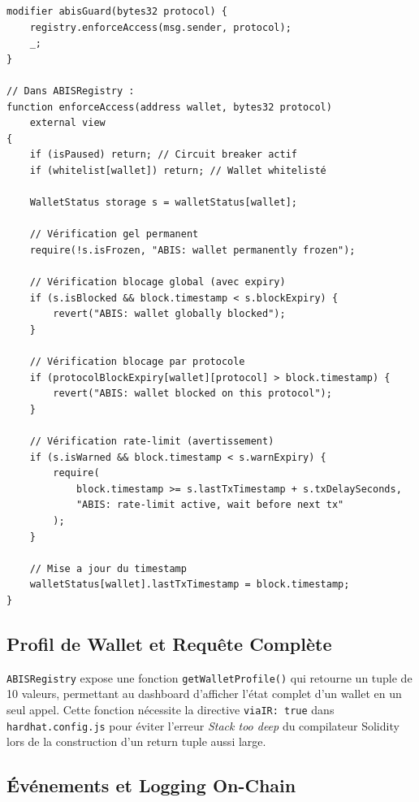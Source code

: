\documentclass[12pt,a4paper]{report}
\newcommand{\code}[1]{\texttt{#1}}
\begin{document}
\begin{lstlisting}[language=Solidity, caption={Modificateur abisGuard et enforceAccess}, label={lst:abis_guard}]
modifier abisGuard(bytes32 protocol) {
    registry.enforceAccess(msg.sender, protocol);
    _;
}

// Dans ABISRegistry :
function enforceAccess(address wallet, bytes32 protocol)
    external view
{
    if (isPaused) return; // Circuit breaker actif
    if (whitelist[wallet]) return; // Wallet whitelisté

    WalletStatus storage s = walletStatus[wallet];

    // Vérification gel permanent
    require(!s.isFrozen, "ABIS: wallet permanently frozen");

    // Vérification blocage global (avec expiry)
    if (s.isBlocked && block.timestamp < s.blockExpiry) {
        revert("ABIS: wallet globally blocked");
    }

    // Vérification blocage par protocole
    if (protocolBlockExpiry[wallet][protocol] > block.timestamp) {
        revert("ABIS: wallet blocked on this protocol");
    }

    // Vérification rate-limit (avertissement)
    if (s.isWarned && block.timestamp < s.warnExpiry) {
        require(
            block.timestamp >= s.lastTxTimestamp + s.txDelaySeconds,
            "ABIS: rate-limit active, wait before next tx"
        );
    }

    // Mise a jour du timestamp
    walletStatus[wallet].lastTxTimestamp = block.timestamp;
}
\end{lstlisting}

\subsection{Profil de Wallet et Requête Complète}

\code{ABISRegistry} expose une fonction \code{getWalletProfile()} qui retourne un tuple de 10 valeurs, permettant au dashboard d'afficher l'état complet d'un wallet en un seul appel. Cette fonction nécessite la directive \code{viaIR: true} dans \code{hardhat.config.js} pour éviter l'erreur \textit{Stack too deep} du compilateur Solidity lors de la construction d'un return tuple aussi large.

\subsection{Événements et Logging On-Chain}
\end{document}
